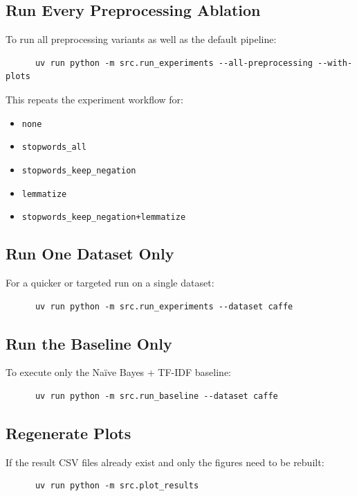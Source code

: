 \documentclass[10pt,a4paper]{article}
\begin{document}
\subsection{Run Every Preprocessing Ablation}
To run all preprocessing variants as well as the default pipeline:

\begin{verbatim}
      uv run python -m src.run_experiments --all-preprocessing --with-plots
\end{verbatim}
This repeats the experiment workflow for:

\begin{itemize}
\item \texttt{none}
\item \texttt{stopwords\_all}
\item \texttt{stopwords\_keep\_negation}
\item \texttt{lemmatize}
\item \texttt{stopwords\_keep\_negation+lemmatize}
\end{itemize}


\subsection{Run One Dataset Only}
For a quicker or targeted run on a single dataset:

\begin{verbatim}
      uv run python -m src.run_experiments --dataset caffe
\end{verbatim}


\subsection{Run the Baseline Only}
To execute only the Naïve Bayes + TF-IDF baseline:

\begin{verbatim}
      uv run python -m src.run_baseline --dataset caffe
\end{verbatim}


\subsection{Regenerate Plots}
If the result CSV files already exist and only the figures need to be rebuilt:

\begin{verbatim}
      uv run python -m src.plot_results
\end{verbatim}
\end{document}
